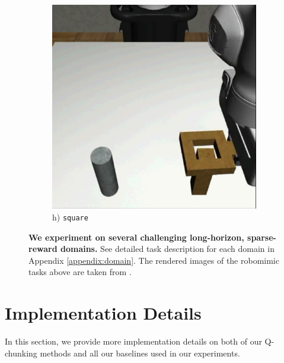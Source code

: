 \begin{figure}[t]
\begin{minipage}{0.24\textwidth}
\begin{subfigure}{\textwidth}
            \includegraphics[width=\linewidth]{figures/renders/square.jpeg}
            \caption{\footnotesize h) \texttt{square}}
        \end{subfigure}
    \end{minipage}\hfill
    \caption{\footnotesize \textbf{We experiment on several challenging long-horizon, sparse-reward domains.} See detailed task description for each domain in Appendix \ref{appendix:domain}. The rendered images of the robomimic tasks above are taken from \citet{robomimic2021}.}
    \label{fig:env_renders}
\end{figure}




\section{Implementation Details}
\label{appendix:impl-details}
In this section, we provide more implementation details on both of our Q-chunking methods and all our baselines used in our experiments.





